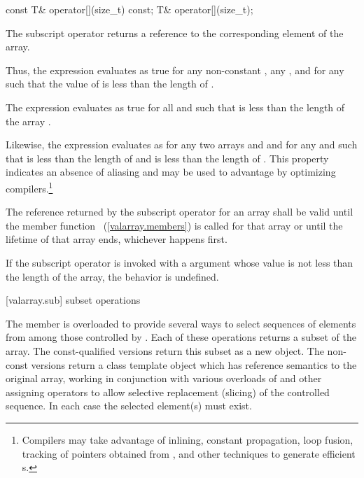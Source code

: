 %
\begin{itemdecl}
const T&  operator[](size_t) const;
T& operator[](size_t);
\end{itemdecl}

\begin{itemdescr}
\pnum
The subscript operator
returns a reference to the corresponding element of the array.

\pnum
Thus, the expression
evaluates as true for any non-constant
,
any
,
and for any
such that the value of
is less than the length of
.

\pnum
The expression
evaluates as true for all
and
such that
is less than the length of the array
.

\pnum
Likewise, the expression
evaluates as
for any two arrays
and
and for any
and
such that
is less than the length of
and
is less than the length of
.
This property indicates an absence of aliasing and may be used to
advantage by optimizing compilers.\footnote{Compilers may take advantage
of inlining, constant propagation, loop fusion,
tracking of pointers obtained from
,
and other
techniques to generate efficient
s.}

\pnum
The reference returned by the subscript operator for an array shall
be valid until the member function
~(\ref{valarray.members}) is called for that array or until the lifetime of
that array ends, whichever happens first.

\pnum
If the subscript operator
is invoked with a
argument whose value is not
less than the length of the array, the behavior is undefined.%
\end{itemdescr}

[valarray.sub]{ subset operations}

%
\pnum
The member  is overloaded to provide several ways to select
sequences of elements from among those controlled by . Each of these
operations returns a subset of the array. The const-qualified versions return this
subset as a new  object. The non-const versions return a class
template object which has reference semantics to the original array, working in
conjunction with various overloads of  and other assigning
operators to allow selective replacement (slicing) of the controlled sequence.
In each case the selected element(s) must exist.

